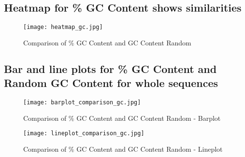 \documentclass{article}%
\begin{document}
%
\subsection{Heatmap for \% GC Content shows similarities}%
\label{subsec:HeatmapforGCContentshowssimilarities}%


\begin{figure}[h!]%
\centering%
\texttt{[image: heatmap\_gc.jpg]}%
\caption{Comparison of \% GC Content and GC Content Random}%
\end{figure}

%
\subsection{Bar and line plots for \% GC Content and Random GC Content for whole sequences}%
\label{subsec:BarandlineplotsforGCContentandRandomGCContentforwholesequences}%


\begin{figure}[h!]%
\centering%
\texttt{[image: barplot\_comparison\_gc.jpg]}%
\caption{Comparison of \% GC Content and GC Content Random {-} Barplot}%
\end{figure}

%


\begin{figure}[h!]%
\centering%
\texttt{[image: lineplot\_comparison\_gc.jpg]}%
\caption{Comparison of \% GC Content and GC Content Random {-} Lineplot}%
\end{figure}

%
\end{document}
